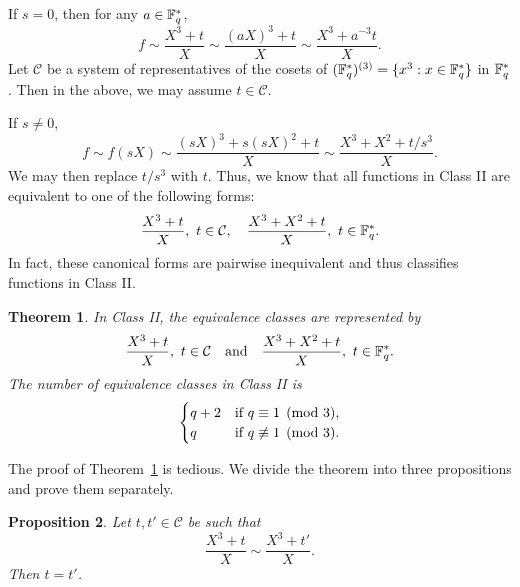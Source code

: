 \documentclass{amsart}
\newtheorem{thm}{Theorem}[section]
\newtheorem{prop}[thm]{Proposition}
\numberwithin{equation}{section}
\theoremstyle{definition}
\newcommand{\f}{\Bbb F}
\begin{document}
If $s =0$, then for any $a \in \f_q^*$, 
\[
f\sim \frac{X^3+t}X\sim \frac{(aX)^3+t}X\sim\frac{X^3+a^{-3}t}X.
\]
Let $\mathcal C$ be a system of representatives of the cosets of $(\f_q^*)^{(3)}=\{x^3:x\in\f_q^*\}$ in $\f_q^*$. Then in the above, we may assume $t\in\mathcal C$.  

If $s\ne 0$, 
\[
f\sim f(sX)\sim\frac{(sX)^3+s(sX)^2+t}X\sim\frac{X^3+X^2+t/s^3}X.
\]
We may then replace $t/s^3$ with $t$. Thus, we know that all functions in Class II are equivalent to one of the following forms: 
\[
\frac{X^3 + t}{X},\  t\in\mathcal C, \quad  \frac{X^3 + X^2 + t}{X},\ t\in\f_q^*.
\]
In fact, these canonical forms are pairwise inequivalent and thus classifies functions in Class II. 

\begin{thm}\label{Theorem 1}
In Class II, the equivalence classes are represented by
\[
\frac{X^3+t}X,\ t\in\mathcal C\quad \text{and}\quad \frac{X^3+X^2+t}X,\ t\in\f_q^*.
\]
The number of equivalence classes in Class II is
\[
\begin{cases}
q+2&\text{if}\ q\equiv 1\pmod 3,\cr
q&\text{if}\ q\not\equiv 1\pmod 3.
\end{cases}
\]
\end{thm}

\medskip
The proof of Theorem~\ref{Theorem 1} is tedious. We divide the theorem into three propositions and prove them separately.

\begin{prop}\label{Proposition 1.1}
Let $t,t'\in\mathcal C$ be such that
\[
\frac{X^3+t}X\sim\frac{X^3+t'}X.
\]
Then $t=t'$.
\end{prop}
\end{document}
